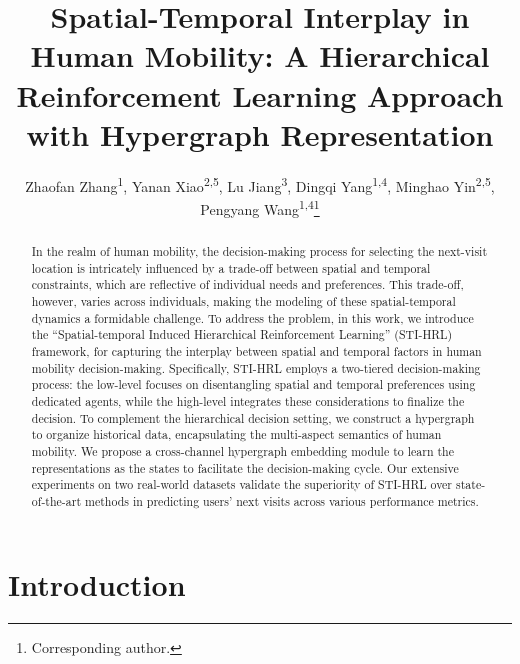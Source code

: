 \documentclass[letterpaper]{article} %
\title{Spatial-Temporal Interplay in Human Mobility: A Hierarchical Reinforcement Learning Approach with Hypergraph Representation}
\author{
    Zhaofan Zhang\textsuperscript{\rm 1}\equalcontrib,
    Yanan Xiao\textsuperscript{\rm 2,5}\equalcontrib,
    Lu Jiang\textsuperscript{\rm 3},
    Dingqi Yang\textsuperscript{\rm 1,4},
    Minghao Yin\textsuperscript{\rm 2,5},
    Pengyang Wang\textsuperscript{\rm 1,4}\thanks{Corresponding author.}
}
\begin{document}
\maketitle

\begin{abstract}
In the realm of human mobility, the decision-making process for selecting the next-visit location is intricately influenced by a trade-off between spatial and temporal constraints, which are reflective of individual needs and preferences. 
This trade-off, however, varies across individuals, making the modeling of these spatial-temporal dynamics a formidable challenge. 
To address the problem, in this work, we introduce the ``Spatial-temporal Induced Hierarchical Reinforcement Learning'' (STI-HRL) framework, for capturing the interplay between spatial and temporal factors in human mobility decision-making. 
Specifically, STI-HRL employs a two-tiered decision-making process: the low-level focuses on disentangling spatial and temporal preferences using dedicated agents, while the high-level integrates these considerations to finalize the decision. 
To complement the hierarchical decision setting, we construct a hypergraph to organize historical data, encapsulating the multi-aspect semantics of human mobility. 
We propose a cross-channel hypergraph embedding module to learn the representations as the states to facilitate the decision-making cycle.
Our extensive experiments on two real-world datasets validate the superiority of STI-HRL over state-of-the-art methods in predicting users' next visits across various performance metrics.

\end{abstract}

\section{Introduction}
\end{document}
